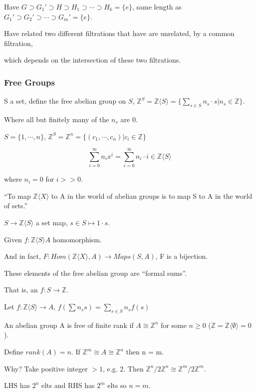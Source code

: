 \documentclass[12pt]{article}
\begin{document}
Have $G \supset G_1' \supset H \supset H_1 \supset \cdots \supset H_k = \{e\}$, same length as $G_1' \supset G_2' \supset \cdots \supset G_m' = \{e\}$.

Have related two different filtrations that have are unrelated, by a common filtration,

which depends on the intersection of these two filtrations.

\subsubsection{Free Groups}

\noindent
S a set, define the free abelian group on $S$, $\mathds{Z}^S = \mathds{Z}\langle S\rangle = \{\sum_{s \in S} n_s \cdot s | n_s \in \mathds{Z}\}$.

Where all but finitely many of the $n_s$ are 0.

$S = \{1, \cdots, n\}$, $\mathds{Z}^S = \mathds{Z}^n = \{(c_1, \cdots, c_n) | c_i \in \mathds{Z}\}$

$$\sum_{i = 0}^\infty n_i x^i = \sum_{i = 0}^\infty n_i \cdot i \in \mathds{Z}\langle S \rangle$$

where $n_i = 0$ for $i >> 0$.

\noindent
``To map $\mathds{Z}\langle X\rangle$ to A in the world of abelian groups is to map S to A in the world of sets.''

$S \to \mathds{Z}\langle S \rangle$ a set map, $s \in S \mapsto 1 \cdot s$.

Given $f: \mathds{Z} \langle S \rangle A$ homomorphism.

And in fact, $F: Hom(\mathds{Z} \langle X\rangle, A) \to Maps(S, A)$, F is a bijection.

\noindent
These elements of the free abelian group are ``formal sums''.

That is, an $f: S \to \mathds{Z}$.

\noindent
Let $f: \mathds{Z}\langle S\rangle \to A$, $f(\sum n_ss) = \sum_{s \in S}n_sf(s)$

\noindent
An abelian group A is free of finite rank if $A \cong \mathds{Z}^n$ for some $n \geq 0$ ($\mathds{Z} = \mathds{Z}\langle \emptyset \rangle = 0$).

Define $rank(A) = n$.  If $\mathds{Z}^m \cong A \cong \mathds{Z}^n$ then n = m.

Why? Take positive integer $> 1$, e.g. 2.  Then $\mathds{Z}^n/2\mathds{Z}^n \cong \mathds{Z}^m/2\mathds{Z}^m$.

LHS has $2^n$ elts and RHS has $2^m$ elts so $n = m$. \\
\end{document}
